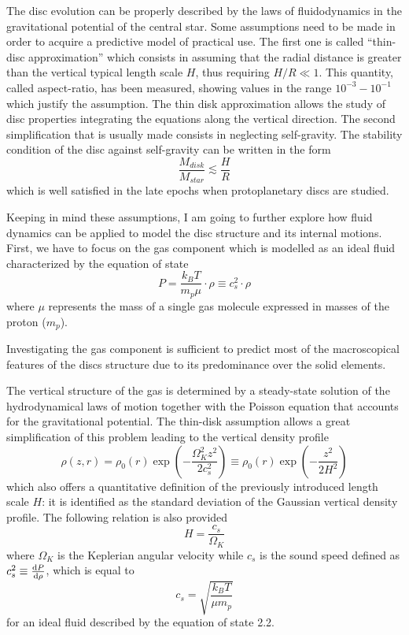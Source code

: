 \documentclass[a4paper,10pt]{report}
\begin{document}
The disc evolution can be properly described by the laws of fluidodynamics in the gravitational potential of the central star.
Some assumptions need to be made in order to acquire a predictive model of practical use.
The first one is called ``thin-disc approximation'' which consists in assuming that the radial distance is greater than 
the vertical typical length scale $H$, thus requiring $H/R \ll 1$. This quantity, called aspect-ratio, has been measured, 
showing values in the range $10^{-3}-10^{-1}$ which justify the assumption. The thin disk approximation allows the study of disc properties integrating
the equations along the vertical direction.
The second simplification that is usually made consists in neglecting self-gravity.
The stability condition of the disc against self-gravity can be written in the form
\begin{equation}
    \frac{M_{disk}}{M_{star}} \lesssim  \frac{H}{R}
\end{equation}
which is well satisfied in the late epochs when protoplanetary discs are studied.

Keeping in mind these assumptions, I am going to further explore how fluid dynamics can be applied to model the disc 
structure and its internal motions. First, we have to focus on the gas component which is modelled as an ideal fluid characterized
by the equation of state
\begin{equation}
    P = \frac{k_BT}{m_p\mu}\cdot \rho \equiv c_s^2 \cdot \rho
\end{equation}
where $\mu$ represents the mass of a single gas molecule expressed in masses of the proton ($m_p$).

Investigating the gas component is sufficient to predict most of the macroscopical features of the discs structure due to its
predominance over the solid elements. 

The vertical structure of the gas is determined by a steady-state solution of the hydrodynamical laws of motion together with the Poisson equation that
accounts for the gravitational potential. The thin-disk assumption allows a great simplification
 of this problem leading to the vertical density profile
\begin{equation}
    \rho(z, r) = \rho_0(r)\exp(-\frac{\Omega_K^2z^2}{2c_s^2}) \equiv \rho_0(r)\exp(-\frac{z^2}{2H^2})
\end{equation}
which also offers a quantitative definition of the previously introduced length scale
$H$: it is identified as the 
standard deviation of the Gaussian vertical density profile.
The following relation is also provided
\begin{equation}
    H = \frac{c_s}{\Omega_K}
\end{equation}
where $\Omega_K$ is the Keplerian 
angular velocity while $c_s$ is the sound speed defined as $c_s^2 \equiv \dv{P}{\rho}$, which is equal to 
\begin{equation}
    c_s = \sqrt{\frac{k_BT}{\mu m_p}}
\end{equation}
for an 
ideal fluid described by the equation of state 2.2.
\end{document}
